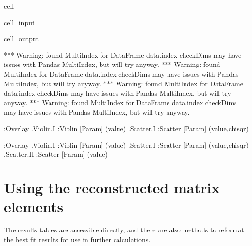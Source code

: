 \documentclass[letterpaper,table,10pt,english]{jupyterBook}
\begin{document}
\begin{sphinxuseclass}{cell}
\begin{sphinxVerbatimInput}
\begin{sphinxuseclass}{cell_input}
\begin{sphinxVerbatim}[commandchars=\\\{\}]
\end{sphinxVerbatim}

\end{sphinxuseclass}\end{sphinxVerbatimInput}
\begin{sphinxVerbatimOutput}

\begin{sphinxuseclass}{cell_output}
\begin{sphinxVerbatim}[commandchars=\\\{\}]
*** Warning: found MultiIndex for DataFrame data.index \PYGZhy{} checkDims may have issues with Pandas MultiIndex, but will try anyway.
*** Warning: found MultiIndex for DataFrame data.index \PYGZhy{} checkDims may have issues with Pandas MultiIndex, but will try anyway.
*** Warning: found MultiIndex for DataFrame data.index \PYGZhy{} checkDims may have issues with Pandas MultiIndex, but will try anyway.
*** Warning: found MultiIndex for DataFrame data.index \PYGZhy{} checkDims may have issues with Pandas MultiIndex, but will try anyway.
\end{sphinxVerbatim}

\begin{sphinxVerbatim}[commandchars=\\\{\}]
:Overlay
   .Violin.I  :Violin   [Param]   (value)
   .Scatter.I :Scatter   [Param]   (value,chisqr)
\end{sphinxVerbatim}

\begin{sphinxVerbatim}[commandchars=\\\{\}]
:Overlay
   .Violin.I   :Violin   [Param]   (value)
   .Scatter.I  :Scatter   [Param]   (value,chisqr)
   .Scatter.II :Scatter   [Param]   (value)
\end{sphinxVerbatim}

\end{sphinxuseclass}\end{sphinxVerbatimOutput}

\end{sphinxuseclass}

\section{Using the reconstructed matrix elements}
\label{\detokenize{part2/case-study-N2_290723:using-the-reconstructed-matrix-elements}}
\sphinxAtStartPar
The results tables are accessible directly, and there are also methods to reformat the best fit results for use in further calculations.
\end{document}
